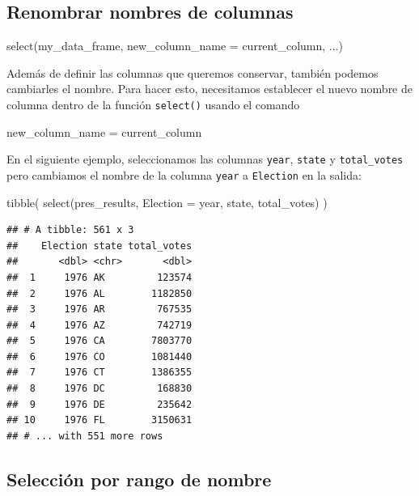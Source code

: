 \documentclass[
]{book}
\newenvironment{Shaded}{\begin{snugshade}}{\end{snugshade}}
\newcommand{\AttributeTok}[1]{\textcolor[rgb]{0.77,0.63,0.00}{#1}}
\newcommand{\FunctionTok}[1]{\textcolor[rgb]{0.00,0.00,0.00}{#1}}
\newcommand{\NormalTok}[1]{#1}
\newcommand{\OtherTok}[1]{\textcolor[rgb]{0.56,0.35,0.01}{#1}}
\begin{document}
\hypertarget{renombrar-nombres-de-columnas}{%
\subsection{Renombrar nombres de columnas}\label{renombrar-nombres-de-columnas}}

\begin{Shaded}
\begin{Highlighting}[]
\FunctionTok{select}\NormalTok{(my\_data\_frame, }\AttributeTok{new\_column\_name =}\NormalTok{ current\_column, ...)}
\end{Highlighting}
\end{Shaded}

Además de definir las columnas que queremos conservar, también podemos cambiarles el nombre. Para hacer esto, necesitamos establecer el nuevo nombre de columna dentro de la función \texttt{select()} usando el comando

\begin{Shaded}
\begin{Highlighting}[]
\NormalTok{new\_column\_name }\OtherTok{=}\NormalTok{ current\_column}
\end{Highlighting}
\end{Shaded}

En el siguiente ejemplo, seleccionamos las columnas \texttt{year}, \texttt{state} y \texttt{total\_votes} pero cambiamos el nombre de la columna \texttt{year} a \texttt{Election} en la salida:

\begin{Shaded}
\begin{Highlighting}[]
\FunctionTok{tibble}\NormalTok{(}
\FunctionTok{select}\NormalTok{(pres\_results, }\AttributeTok{Election =}\NormalTok{ year, state, total\_votes)}
\NormalTok{)}
\end{Highlighting}
\end{Shaded}

\begin{verbatim}
## # A tibble: 561 x 3
##    Election state total_votes
##       <dbl> <chr>       <dbl>
##  1     1976 AK         123574
##  2     1976 AL        1182850
##  3     1976 AR         767535
##  4     1976 AZ         742719
##  5     1976 CA        7803770
##  6     1976 CO        1081440
##  7     1976 CT        1386355
##  8     1976 DC         168830
##  9     1976 DE         235642
## 10     1976 FL        3150631
## # ... with 551 more rows
\end{verbatim}

\hypertarget{selecciuxf3n-por-rango-de-nombre}{%
\subsection{Selección por rango de nombre}\label{selecciuxf3n-por-rango-de-nombre}}
\end{document}
